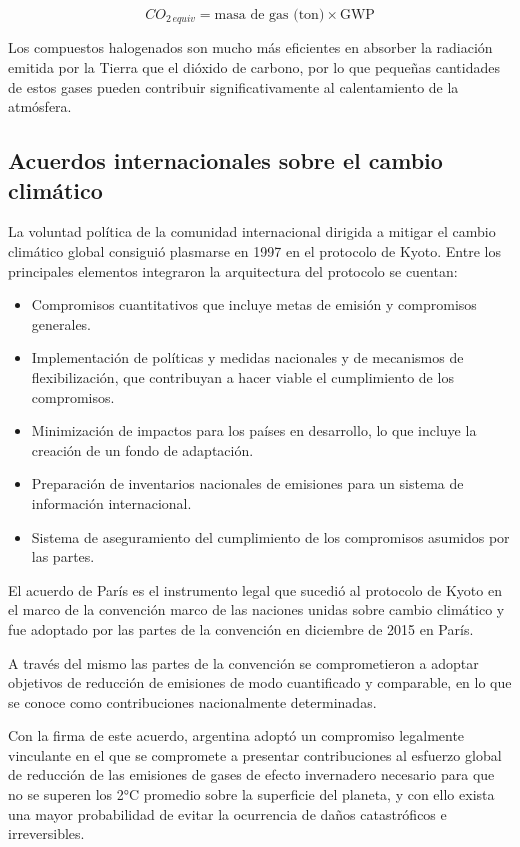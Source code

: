 	\begin{equation}
		CO_{2\, equiv} = \text{masa de gas (ton)} \times \text{GWP}
	\end{equation}

	Los compuestos halogenados son mucho más eficientes en absorber la radiación emitida por la Tierra que el dióxido de carbono, por lo que pequeñas cantidades de estos gases pueden contribuir significativamente al calentamiento de la atmósfera.

	\subsection{Acuerdos internacionales sobre el cambio climático}

	La voluntad política de la comunidad internacional dirigida a mitigar el cambio climático global consiguió plasmarse en 1997 en el protocolo de Kyoto. Entre los principales elementos  integraron la arquitectura del protocolo se cuentan:

	\begin{itemize}
		\item Compromisos cuantitativos que incluye metas de emisión y compromisos generales.
		\item Implementación de políticas y medidas nacionales y de mecanismos de flexibilización, que contribuyan a hacer viable el cumplimiento de los compromisos.
		\item Minimización de impactos para los países en desarrollo, lo que incluye la creación de un fondo de adaptación.
		\item Preparación de inventarios nacionales de emisiones para un sistema de información internacional.
		\item Sistema de aseguramiento del cumplimiento de los compromisos asumidos por las partes.
	\end{itemize}

	El acuerdo de París es el instrumento legal que sucedió al protocolo de Kyoto en el marco de la convención marco de las naciones unidas sobre cambio climático y fue adoptado por las partes de la convención en diciembre de 2015 en París.

	A través del mismo las partes de la convención se comprometieron a adoptar objetivos de reducción de emisiones de modo cuantificado y comparable, en lo que  se conoce como contribuciones nacionalmente determinadas.

	Con la firma de este acuerdo, argentina adoptó un compromiso legalmente vinculante en el que se compromete a presentar contribuciones al esfuerzo global de reducción de las emisiones de gases de efecto invernadero necesario para que no se superen los 2°C promedio sobre la superficie del planeta, y con ello exista una mayor probabilidad de evitar la ocurrencia de daños catastróficos e irreversibles. 

